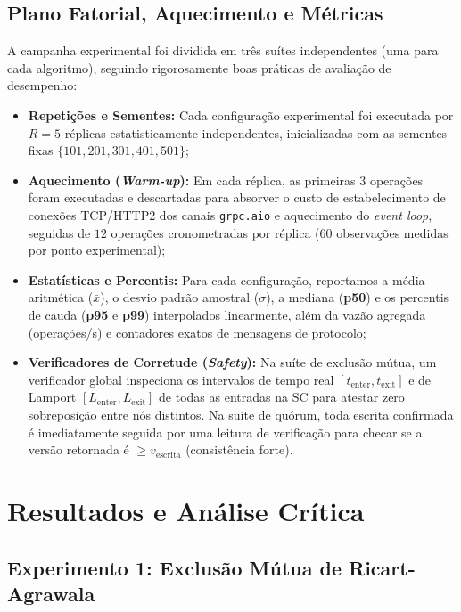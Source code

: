 \documentclass[conference,10pt]{IEEEtran}
\begin{document}
\subsection{Plano Fatorial, Aquecimento e Métricas}

A campanha experimental foi dividida em três suítes independentes (uma para cada algoritmo), seguindo rigorosamente boas práticas de avaliação de desempenho:
\begin{itemize}
    \item \textbf{Repetições e Sementes:} Cada configuração experimental foi executada por $R = 5$ réplicas estatisticamente independentes, inicializadas com as sementes fixas $\{101, 201, 301, 401, 501\}$;
    \item \textbf{Aquecimento (\textit{Warm-up}):} Em cada réplica, as primeiras $3$ operações foram executadas e descartadas para absorver o custo de estabelecimento de conexões TCP/HTTP2 dos canais \texttt{grpc.aio} e aquecimento do \textit{event loop}, seguidas de $12$ operações cronometradas por réplica ($60$ observações medidas por ponto experimental);
    \item \textbf{Estatísticas e Percentis:} Para cada configuração, reportamos a média aritmética ($\bar{x}$), o desvio padrão amostral ($\sigma$), a mediana (\textbf{p50}) e os percentis de cauda (\textbf{p95} e \textbf{p99}) interpolados linearmente, além da vazão agregada (operações/s) e contadores exatos de mensagens de protocolo;
    \item \textbf{Verificadores de Corretude (\textit{Safety}):} Na suíte de exclusão mútua, um verificador global inspeciona os intervalos de tempo real $[t_{\text{enter}}, t_{\text{exit}}]$ e de Lamport $[L_{\text{enter}}, L_{\text{exit}}]$ de todas as entradas na SC para atestar zero sobreposição entre nós distintos. Na suíte de quórum, toda escrita confirmada é imediatamente seguida por uma leitura de verificação para checar se a versão retornada é $\ge v_{\text{escrita}}$ (consistência forte).
\end{itemize}

\section{Resultados e Análise Crítica}

\subsection{Experimento 1: Exclusão Mútua de Ricart-Agrawala}
\end{document}
